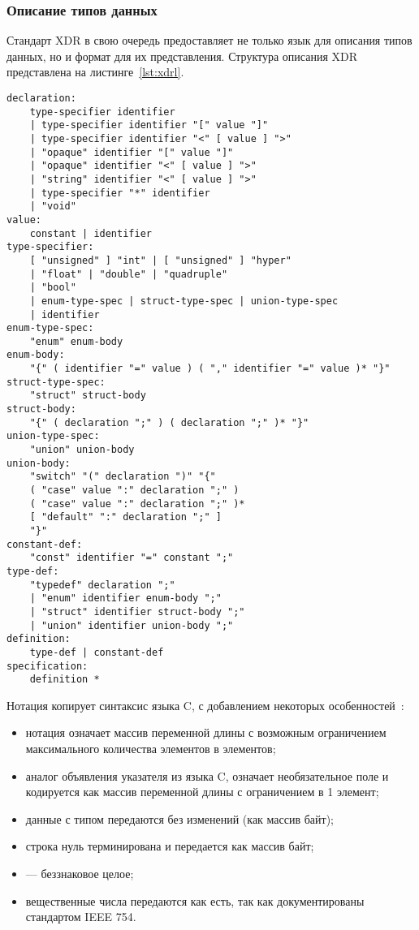 \subsubsection{Описание типов данных}

Стандарт XDR в свою очередь предоставляет не только язык для описания типов
данных, но и формат для их представления. Структура описания XDR представлена
на листинге~\ref{lst:xdrl}.

\clearpage

\begin{lstlisting}[caption={Структура XDR}, label={lst:xdrl}]
declaration:
    type-specifier identifier
    | type-specifier identifier "[" value "]"
    | type-specifier identifier "<" [ value ] ">"
    | "opaque" identifier "[" value "]"
    | "opaque" identifier "<" [ value ] ">"
    | "string" identifier "<" [ value ] ">"
    | type-specifier "*" identifier
    | "void"
value:
    constant | identifier
type-specifier:
    [ "unsigned" ] "int" | [ "unsigned" ] "hyper"
    | "float" | "double" | "quadruple"
    | "bool"
    | enum-type-spec | struct-type-spec | union-type-spec
    | identifier
enum-type-spec:
    "enum" enum-body
enum-body:
    "{" ( identifier "=" value ) ( "," identifier "=" value )* "}"
struct-type-spec:
    "struct" struct-body
struct-body:
    "{" ( declaration ";" ) ( declaration ";" )* "}"
union-type-spec:
    "union" union-body
union-body:
    "switch" "(" declaration ")" "{"
    ( "case" value ":" declaration ";" )
    ( "case" value ":" declaration ";" )*
    [ "default" ":" declaration ";" ]
    "}"
constant-def:
    "const" identifier "=" constant ";"
type-def:
    "typedef" declaration ";"
    | "enum" identifier enum-body ";"
    | "struct" identifier struct-body ";"
    | "union" identifier union-body ";"
definition:
    type-def | constant-def
specification:
    definition *
\end{lstlisting}

\clearpage

Нотация копирует синтаксис языка C, с добавлением некоторых
особенностей~\cite{rfc4506}:
\begin{itemize}
    \item нотация  означает массив переменной длины с
          возможным ограничением максимального количества элементов в
           элементов;
    \item аналог объявления указателя из языка C, означает необязательное поле
          и кодируется как массив переменной длины с ограничением в 1 элемент;
    \item данные с типом  передаются без изменений (как массив
          байт);
    \item строка  нуль терминирована и передается как массив байт;
    \item {} --- беззнаковое целое;
    \item вещественные числа передаются как есть, так как документированы
          стандартом IEEE 754.
\end{itemize}

